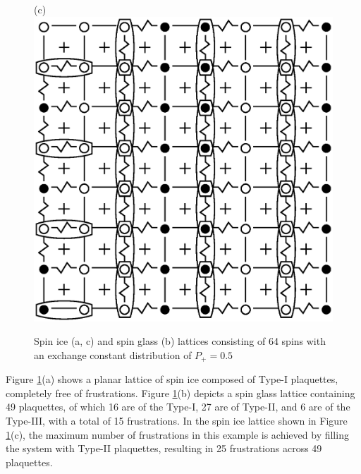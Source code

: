 \documentclass[utf8, babel, sor, jor, amsmath, amssymb, reprint]{elsarticle} %
\begin{document}
\begin{figure}[H]
\begin{minipage}[h]{0.3\linewidth}
	\end{minipage}
	\hfill
	\begin{minipage}[h]{0.3\linewidth}
		\centering(c)
		\includegraphics[width=1\linewidth]{pictures/SI_64_J0}
	\end{minipage}
	\hfill
	\caption{Spin ice (a, c) and spin glass (b) lattices consisting of 64 spins with an exchange constant distribution of $P_+ = 0.5$}
	\label{fig:cell_SI_SG_64}

\end{figure}


Figure \ref{fig:cell_SI_SG_64}(a) shows a planar lattice of spin ice composed of Type-I plaquettes, completely free of frustrations.
Figure \ref{fig:cell_SI_SG_64}(b) depicts a spin glass lattice containing 49 plaquettes, of which 16 are of the Type-I, 27 are of Type-II, and 6 are of the Type-III, with a total of 15 frustrations.
In the spin ice lattice shown in Figure \ref{fig:cell_SI_SG_64}(c), the maximum number of frustrations in this example is achieved by filling the system with Type-II plaquettes, resulting in 25 frustrations across 49 plaquettes.
\end{document}
